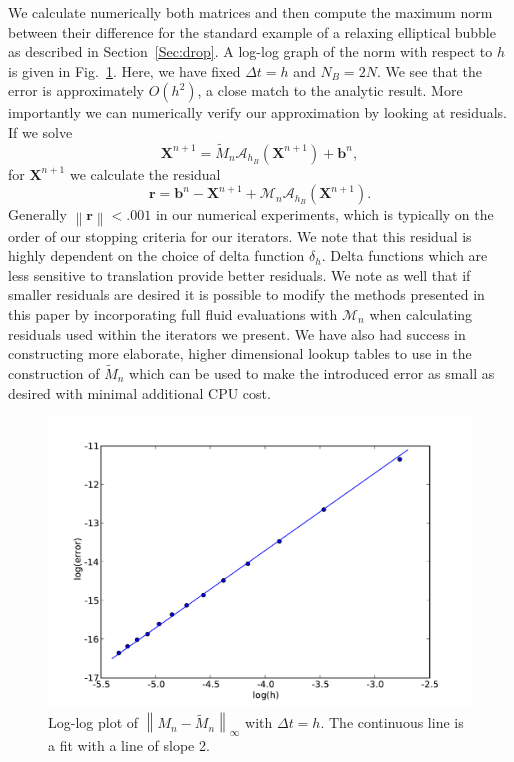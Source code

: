 \documentclass[preprint,12pt]{elsarticle}
\newcommand{\norm}[1]{\left\lVert#1\right\rVert}
\begin{document}
 We calculate numerically both matrices and then compute the maximum norm between their difference for the standard example of
 a relaxing elliptical bubble as described in Section~\ref{Sec:drop}. A log-log graph of the norm with respect to $h$ is given in 
 Fig.~\ref{fig:loglog15}. Here, we have fixed $\Delta t = h$ and $N_B=2N$. We see that the error is approximately $O(h^2)$, a close match to the analytic result. More importantly we can numerically verify our approximation by looking at residuals. If we solve
\begin{equation}
\mathbf{X}^{n+1} = \tilde{M}_n\mathcal{A}_{h_B} (\mathbf{X}^{n+1}) + \mathbf{b}^n, \label{eq:Xnl}
\end{equation}
for $\mathbf{X}^{n+1}$ we calculate the residual
\begin{equation}
\mathbf{r} = \mathbf{b}^n - \mathbf{X}^{n+1} + \mathcal{M}_n\mathcal{A}_{h_B} (\mathbf{X}^{n+1}). \label{eq:Xnl}
\end{equation}
Generally $\norm{\mathbf{r}} < .001$ in our numerical experiments, which is typically on the order of our stopping criteria for our iterators. We note that this residual is highly dependent on the choice of delta function $\delta_h$. Delta functions which are less sensitive to translation provide better residuals. We note as well that if smaller residuals are desired it is possible to modify the methods presented in this paper by incorporating full fluid evaluations with $\mathcal{M}_n$ when calculating residuals used within the iterators we present. We have also had success in constructing more elaborate, higher dimensional lookup tables to use in the construction of $\tilde{M}_n$ which can be used to make the introduced error as small as desired with minimal additional CPU cost.

\begin{figure}[!b]
  \begin{center}
    \includegraphics[bb=0in 0in 7.7in 6.3in,width=4.8in,clip]{matrixerror.pdf}
  \end{center}
  \caption{\small Log-log plot of $\norm{M_n-\tilde{M}_n}_\infty$ with $\Delta t = h$. The continuous line is a fit with a line of slope 2.}
  \label{fig:loglog15}
\end{figure}
\end{document}
